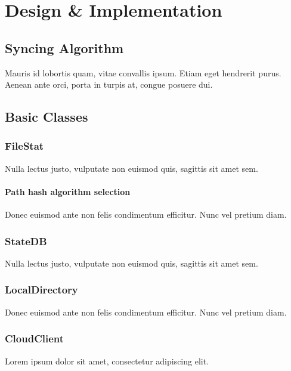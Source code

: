 \chapter{Design \& Implementation}


\section{Syncing Algorithm}
  Mauris id lobortis quam, vitae convallis ipsum. Etiam eget hendrerit purus.
  Aenean ante orci, porta in turpis at, congue posuere dui.

\section{Basic Classes}
  \subsection{FileStat}
    Nulla lectus justo, vulputate non euismod quis, sagittis sit amet sem.
    \subsubsection{Path hash algorithm selection}
      Donec euismod ante non felis condimentum efficitur. Nunc vel pretium diam.
  \subsection{StateDB}
    Nulla lectus justo, vulputate non euismod quis, sagittis sit amet sem.
  \subsection{LocalDirectory}
    Donec euismod ante non felis condimentum efficitur. Nunc vel pretium diam.
  \subsection{CloudClient}
    Lorem ipsum dolor sit amet, consectetur adipiscing elit.
